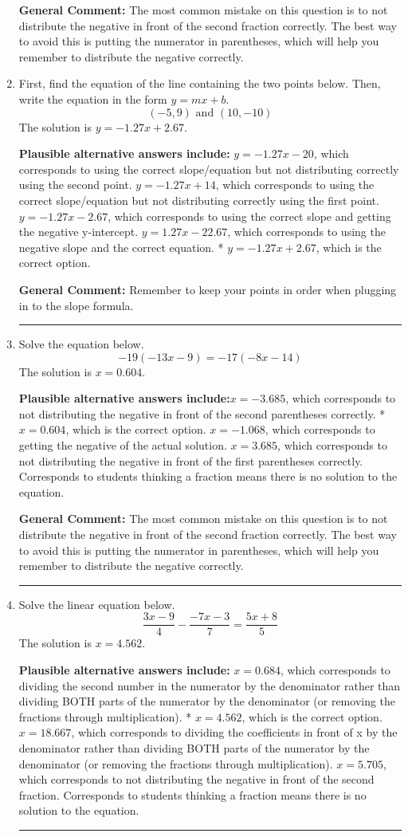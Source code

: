 \documentclass{extbook}[14pt]
\newcommand{\litem}[1]{\item #1

\rule{\textwidth}{0.4pt}}
\begin{document}
\begin{enumerate}
{\textbf{General Comment:} The most common mistake on this question is to not distribute the negative in front of the second fraction correctly. The best way to avoid this is putting the numerator in parentheses, which will help you remember to distribute the negative correctly.
}
\litem{
First, find the equation of the line containing the two points below. Then, write the equation in the form $ y=mx+b $.
\[ (-5, 9) \text{ and } (10, -10) \]The solution is \( y = -1.27x + 2.67 \).\begin{enumerate}[label=\Alph*.]
\textbf{Plausible alternative answers include:} $y = -1.27x -20$, which corresponds to using the correct slope/equation but not distributing correctly using the second point.
 $y = -1.27x + 14$, which corresponds to using the correct slope/equation but not distributing correctly using the first point.
 $y = -1.27x -2.67$, which corresponds to using the correct slope and getting the negative y-intercept.
 $y = 1.27x -22.67$, which corresponds to using the negative slope and the correct equation.
* $y = -1.27x + 2.67$, which is the correct option.
\end{enumerate}

\textbf{General Comment:} Remember to keep your points in order when plugging in to the slope formula.
}
\litem{
Solve the equation below.
\[ -19(-13x -9) = -17(-8x -14) \]The solution is \( x = 0.604 \).\begin{enumerate}[label=\Alph*.]
\textbf{Plausible alternative answers include:}$x = -3.685$, which corresponds to not distributing the negative in front of the second parentheses correctly.
* $x = 0.604$, which is the correct option.
$x = -1.068$, which corresponds to getting the negative of the actual solution.
$x = 3.685$, which corresponds to not distributing the negative in front of the first parentheses correctly.
Corresponds to students thinking a fraction means there is no solution to the equation.
\end{enumerate}

\textbf{General Comment:} The most common mistake on this question is to not distribute the negative in front of the second fraction correctly. The best way to avoid this is putting the numerator in parentheses, which will help you remember to distribute the negative correctly.
}
\litem{
Solve the linear equation below.
\[ \frac{3x -9}{4} - \frac{-7x -3}{7} = \frac{5x + 8}{5} \]The solution is \( x = 4.562 \).\begin{enumerate}[label=\Alph*.]
\textbf{Plausible alternative answers include:} $x = 0.684$, which corresponds to dividing the second number in the numerator by the denominator rather than dividing BOTH parts of the numerator by the denominator (or removing the fractions through multiplication).
* $x = 4.562$, which is the correct option.
 $x = 18.667$, which corresponds to dividing the coefficients in front of x by the denominator rather than dividing BOTH parts of the numerator by the denominator (or removing the fractions through multiplication).
 $x = 5.705$, which corresponds to not distributing the negative in front of the second fraction.
Corresponds to students thinking a fraction means there is no solution to the equation.
\end{enumerate}

}
\end{enumerate}
\end{document}
